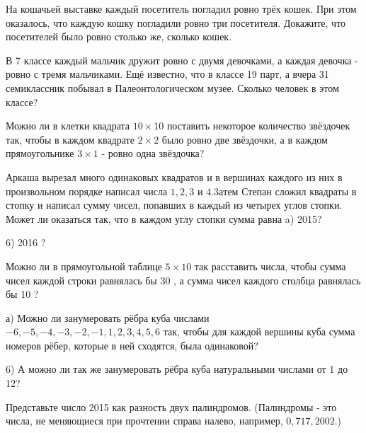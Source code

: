 

На кошачьей выставке каждый посетитель погладил ровно трёх кошек. При этом оказалось, что каждую кошку погладили ровно три посетителя. Докажите, что посетителей было ровно столько же, сколько кошек.

В 7 классе каждый мальчик дружит ровно с двумя девочками, а каждая девочка - ровно с тремя мальчиками. Ещё известно, что в классе 19 парт, а вчера 31 семиклассник побывал в Палеонтологическом музее. Сколько человек в этом классе?

Можно ли в клетки квадрата $10 \times 10$ поставить некоторое количество звёздочек так, чтобы в каждом квадрате $2 \times 2$ было ровно две звёздочки, а в каждом прямоугольнике $3 \times 1$ - ровно одна звёздочка?

Аркаша вырезал много одинаковых квадратов и в вершинах каждого из них в произвольном порядке написал числа $1,2,3$ и $4.3 а т е м$ Степан сложил квадраты в стопку и написал сумму чисел, попавших в каждый из четырех углов стопки. Может ли оказаться так, что в каждом углу стопки сумма равна
a) 2015?

6) 2016 ?

Можно ли в прямоугольной таблице $5 \times 10$ так расставить числа, чтобы сумма чисел каждой строки равнялась бы 30 , а сумма чисел каждого столбца равнялась бы 10 ?

а) Можно ли занумеровать рёбра куба числами $-6,-5,-4,-3,-2,-1,1,2,3,4,5,6$ так, чтобы для каждой вершины куба сумма номеров рёбер, которые в ней сходятся, была одинаковой?

6) А можно ли так же занумеровать рёбра куба натуральными числами от 1 до 12?

Представьте число 2015 как разность двух палиндромов. (Палиндромы - это числа, не меняющиеся при прочтении справа налево, например, $0,717,2002$.)